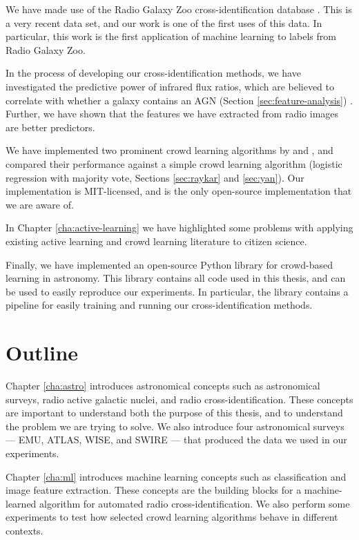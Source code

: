   We have made use of the Radio Galaxy Zoo cross-identification database
  \citep{banfield15}. This is a very recent data set, and our work is one of the
  first uses of this data. In particular, this work is the first application of
  machine learning to labels from Radio Galaxy Zoo.

  In the process of developing our cross-identification methods, we have
  investigated the predictive power of infrared flux ratios, which are believed
  to correlate with whether a galaxy contains an AGN (Section
  \ref{sec:feature-analysis}) \citep{banfield15}. Further, we have shown that
  the features we have extracted from radio images are better predictors.

  We have implemented two prominent crowd learning algorithms by
  \citet{raykar10} and \citet{yan10}, and compared their performance against a
  simple crowd learning algorithm (logistic regression with majority vote,
  Sections \ref{sec:raykar} and \ref{sec:yan}). Our implementation is
  MIT-licensed, and is the only open-source implementation that we are aware of.

  In Chapter \ref{cha:active-learning} we have highlighted some problems with
  applying existing active learning and crowd learning literature to citizen
  science.

  Finally, we have implemented an open-source Python library for crowd-based
  learning in astronomy. This library contains all code used in this thesis, and
  can be used to easily reproduce our experiments. In particular, the library
  contains a pipeline for easily training and running our cross-identification
  methods.

\section{Outline}
\label{sec:outline}
  
  Chapter \ref{cha:astro} introduces astronomical concepts such as astronomical
  surveys, radio active galactic nuclei, and radio cross-identification. These
  concepts are important to understand both the purpose of this thesis, and to
  understand the problem we are trying to solve. We also introduce four
  astronomical surveys --- EMU, ATLAS, WISE, and SWIRE --- that produced the
  data we used in our experiments.

  Chapter \ref{cha:ml} introduces machine learning concepts such as
  classification and image feature extraction. These concepts are the building
  blocks for a machine-learned algorithm for automated radio
  cross-identification. We also perform some experiments to test how selected
  crowd learning algorithms behave in different contexts.

